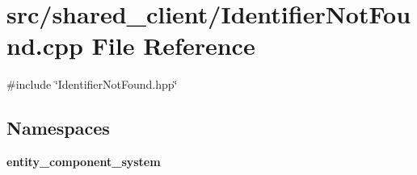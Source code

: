 \section{src/shared\+\_\+client/\+Identifier\+Not\+Found.cpp File Reference}
\label{client_2_identifier_not_found_8cpp}
{\ttfamily \#include \char`\"{}Identifier\+Not\+Found.\+hpp\char`\"{}}\newline
\subsection*{Namespaces}
\begin{DoxyCompactItemize}
\item 
 {\bf entity\+\_\+component\+\_\+system}
\end{DoxyCompactItemize}
